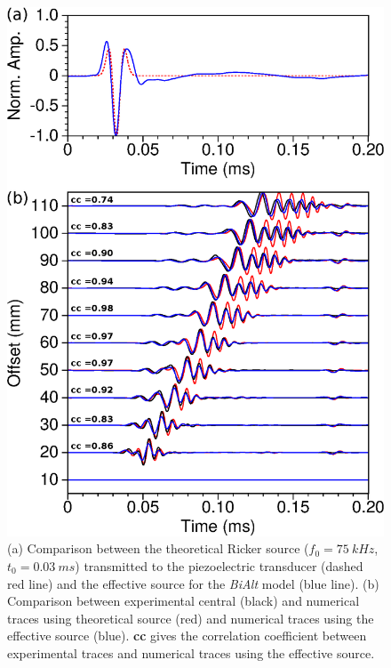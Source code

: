 \documentclass[extra,mreferee]{gji}
\newcommand{\bialt}{\textit{BiAlt} }
\begin{document}
\clearpage
\newpage

\begin{figure}
\centering
\includegraphics[width=0.50\columnwidth]{Fig/Fig10.eps}
\caption{(a) Comparison between the theoretical Ricker source ($f_{0}=75\ kHz$, $t_{0}=0.03\ ms$) transmitted to the piezoelectric transducer (dashed red line) and the effective source for the \bialt model (blue line). (b) Comparison between experimental central (black) and numerical traces using theoretical source (red) and numerical traces using the effective source (blue). \textbf{cc} gives the correlation coefficient between experimental traces and numerical traces using the effective source.}
\label{Fig:Fig11}
\end{figure}
\end{document}
